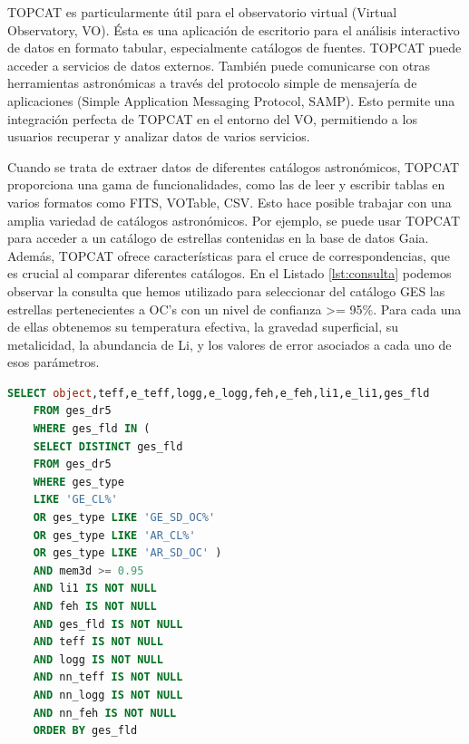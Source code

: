 TOPCAT es particularmente útil para el observatorio virtual (Virtual Observatory, VO). Ésta es una aplicación de escritorio para el análisis interactivo de datos en formato tabular, especialmente catálogos de fuentes. TOPCAT puede acceder a servicios de datos externos. También puede comunicarse con otras herramientas astronómicas a través del protocolo simple de mensajería de aplicaciones (Simple Application Messaging Protocol, SAMP). Esto permite una integración perfecta de TOPCAT en el entorno del VO, permitiendo a los usuarios recuperar y analizar datos de varios servicios.\par

Cuando se trata de extraer datos de diferentes catálogos astronómicos, TOPCAT proporciona una gama de funcionalidades, como las de leer y escribir tablas en varios formatos como FITS, VOTable, CSV. Esto hace posible trabajar con una amplia variedad de catálogos astronómicos. Por ejemplo, se puede usar TOPCAT para acceder a un catálogo de estrellas contenidas en la base de datos Gaia. Además, TOPCAT ofrece características para el cruce de correspondencias, que es crucial al comparar diferentes catálogos. En el Listado \ref{lst:consulta} podemos observar la consulta que hemos utilizado para seleccionar del catálogo GES las estrellas pertenecientes a OC's con un nivel de confianza >= 95\%. Para cada una de ellas obtenemos su temperatura efectiva, la gravedad superficial, su metalicidad, la abundancia de Li, y los valores de error asociados a cada uno de esos parámetros.\par


\begin{lstlisting}[language=SQL, float, caption={Consulta TOPCAT sobre el catálogo GES DR5 para obtener los componentes de los cúmulos abiertos para los cuales se ha determinado una pertenecia mínima del 0.95\%. Las columnas obtenidas informan sobre la identificador de la estrella, $\teff$, $\gsurf$, $\feh$, A(Li) y sus errores asociados, y el identificador del cúmulo al que pertenece.}, label={lst:consulta}]
	SELECT object,teff,e_teff,logg,e_logg,feh,e_feh,li1,e_li1,ges_fld
	FROM ges_dr5 
	WHERE ges_fld IN (
	SELECT DISTINCT ges_fld
	FROM ges_dr5 
	WHERE ges_type 
	LIKE 'GE_CL%' 
	OR ges_type LIKE 'GE_SD_OC%' 
	OR ges_type LIKE 'AR_CL%' 
	OR ges_type LIKE 'AR_SD_OC' )
	AND mem3d >= 0.95
	AND li1 IS NOT NULL
	AND feh IS NOT NULL
	AND ges_fld IS NOT NULL
	AND teff IS NOT NULL
	AND logg IS NOT NULL
	AND nn_teff IS NOT NULL
	AND nn_logg IS NOT NULL
	AND nn_feh IS NOT NULL
	ORDER BY ges_fld
\end{lstlisting}

